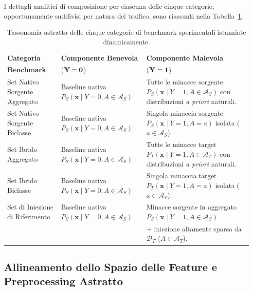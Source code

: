 I dettagli analitici di composizione per ciascuna delle cinque categorie, opportunamente suddivisi per natura del traffico, sono riassunti nella Tabella~\ref{tab:tassonomia_benchmark}.

\begin{table}[H]
    \centering
    \caption{Tassonomia astratta delle cinque categorie di benchmark sperimentali istanziate dinamicamente.}
    \label{tab:tassonomia_benchmark}
    \begin{tabularx}{\textwidth}{>{\raggedright\arraybackslash}p{3.5cm} >{\raggedright\arraybackslash}X >{\raggedright\arraybackslash}X }
    \toprule
    \textbf{Categoria} & \textbf{Componente Benevola} & \textbf{Componente Malevola} \\[-5pt]
    \textbf{Benchmark} & ($\bf{Y=0}$) & ($\bf{Y = 1}$) \\
    \midrule
    Set Nativo Sorgente Aggregato &
    Baseline nativa $P_S(\mathbf{x} \mid Y=0, A \in \mathcal{A}_S)$ &
    Tutte le minacce sorgente $P_S(\mathbf{x} \mid Y=1, A \in \mathcal{A}_S)$ con distribuzioni \textit{a priori} naturali. \\
    \addlinespace
    Set Nativo Sorgente Biclasse &
    Baseline nativa $P_S(\mathbf{x} \mid Y=0, A \in \mathcal{A}_S)$ &
    Singola minaccia sorgente $P_S(\mathbf{x} \mid Y=1, A = a)$ isolata ($a \in \mathcal{A}_S$). \\
    \addlinespace
    Set Ibrido Aggregato &
    Baseline nativa $P_S(\mathbf{x} \mid Y=0, A \in \mathcal{A}_S)$ &
    Tutte le minacce target $P_T(\mathbf{x} \mid Y=1, A \in \mathcal{A}_T)$ con distribuzioni \textit{a priori} naturali. \\
    \addlinespace
    Set Ibrido Biclasse &
    Baseline nativa $P_S(\mathbf{x} \mid Y=0, A \in \mathcal{A}_S)$ &
    Singola minaccia target $P_T(\mathbf{x} \mid Y=1, A = a)$ isolata ($a \in \mathcal{A}_T$). \\
    \addlinespace
    Set di Iniezione di Riferimento &
    Baseline nativa $P_S(\mathbf{x} \mid Y=0, A \in \mathcal{A}_S)$ &
    Minacce sorgente in aggregato $P_S(\mathbf{x} \mid Y=1, A \in \mathcal{A}_S)$ \\
    & & + iniezione altamente sparsa da $\mathcal{D}_T$ ($A \in \mathcal{A}_T$). \\
    \bottomrule
    \end{tabularx}
\end{table}

\subsection{Allineamento dello Spazio delle Feature e Preprocessing Astratto}
\label{subsec:allineamento_feature}

